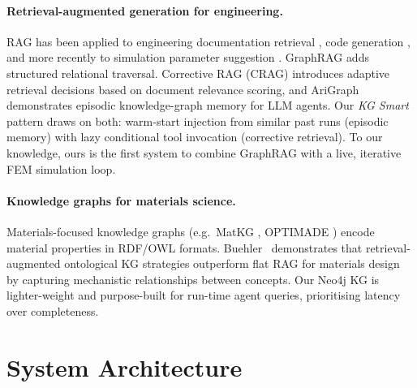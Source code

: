 \documentclass[preprint,review,12pt]{elsarticle}
\begin{document}
\paragraph{Retrieval-augmented generation for engineering.}
RAG \citep{lewis2020rag} has been applied to engineering documentation
retrieval \citep{liao2023rag}, code generation \citep{gao2023rag}, and more
recently to simulation parameter suggestion \citep{yang2024rag}.  GraphRAG
\citep{edge2024graphrag} adds structured relational traversal.
Corrective RAG (CRAG) \citep{yan2024crag} introduces adaptive retrieval
decisions based on document relevance scoring, and AriGraph
\citep{arigraph2024} demonstrates episodic knowledge-graph memory for LLM
agents.  Our \emph{KG Smart} pattern draws on both: warm-start injection
from similar past runs (episodic memory) with lazy conditional tool
invocation (corrective retrieval).  To our knowledge, ours is the first
system to combine GraphRAG with a live, iterative FEM simulation loop.

\paragraph{Knowledge graphs for materials science.}
Materials-focused knowledge graphs (e.g.\ MatKG \citep{venugopal2022matkg},
OPTIMADE \citep{andersen2021optimade}) encode material properties in RDF/OWL
formats.  Buehler~\cite{buehler2024mechgpt} demonstrates that retrieval-augmented
ontological KG strategies outperform flat RAG for materials design by
capturing mechanistic relationships between concepts.
Our Neo4j KG is lighter-weight and purpose-built for run-time
agent queries, prioritising latency over completeness.

\section{System Architecture}
\label{sec:system}
\end{document}
